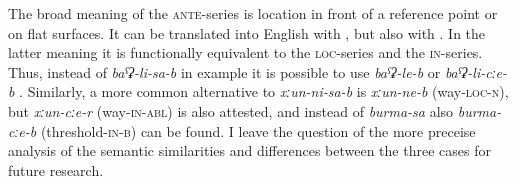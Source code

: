 The broad meaning of the \textsc{ante}-series is location in front of a reference point or on flat surfaces. It can be translated into English with , but also with . In the latter meaning it is functionally equivalent to the \textsc{loc}-series and the \textsc{in}-series. Thus, instead of \textit{baˁʡ-li-sa-b} in example  it is possible to use \textit{baˁʡ-le-b}  or \textit{baˁʡ-li-cːe-b} . Similarly, a more common alternative to \textit{xːun-ni-sa-b}  is \textit{xːun-ne-b} (way-\textsc{loc-n}), but \textit{xːun-cːe-r} (way-\textsc{in-abl}) is also attested, and instead of \textit{burma-sa}  also \textit{burma-cːe-b} (threshold-\textsc{in-b}) can be found. I leave the question of the more preceise analysis of the semantic similarities and differences between the three cases for future research.
%
